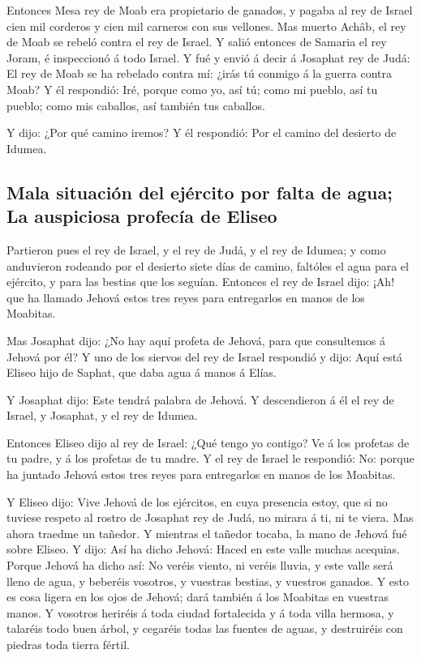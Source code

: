  Entonces Mesa rey de Moab era propietario de ganados, y
pagaba al rey de Israel cien mil corderos y cien mil carneros con sus
vellones.  Mas muerto Achâb, el rey de Moab se rebeló contra
el rey de Israel.  Y salió entonces de Samaria el rey Joram,
é inspeccionó á todo Israel.  Y fué y envió á decir á
Josaphat rey de Judá: El rey de Moab se ha rebelado contra mí: ¿irás tú
conmigo á la guerra contra Moab? Y él respondió: Iré, porque como yo,
así tú; como mi pueblo, así tu pueblo; como mis caballos, así también
tus caballos.

 Y dijo: ¿Por qué camino iremos? Y él respondió: Por el
camino del desierto de Idumea.

\hypertarget{mala-situaciuxf3n-del-ejuxe9rcito-por-falta-de-agua-la-auspiciosa-profecuxeda-de-eliseo}{%
\subsection{Mala situación del ejército por falta de agua; La auspiciosa
profecía de
Eliseo}\label{mala-situaciuxf3n-del-ejuxe9rcito-por-falta-de-agua-la-auspiciosa-profecuxeda-de-eliseo}}

 Partieron pues el rey de Israel, y el rey de Judá, y el rey
de Idumea; y como anduvieron rodeando por el desierto siete días de
camino, faltóles el agua para el ejército, y para las bestias que los
seguían.  Entonces el rey de Israel dijo: ¡Ah! que ha
llamado Jehová estos tres reyes para entregarlos en manos de los
Moabitas.

 Mas Josaphat dijo: ¿No hay aquí profeta de Jehová, para
que consultemos á Jehová por él? Y uno de los siervos del rey de Israel
respondió y dijo: Aquí está Eliseo hijo de Saphat, que daba agua á manos
á Elías.

 Y Josaphat dijo: Este tendrá palabra de Jehová. Y
descendieron á él el rey de Israel, y Josaphat, y el rey de Idumea.

 Entonces Eliseo dijo al rey de Israel: ¿Qué tengo yo
contigo? Ve á los profetas de tu padre, y á los profetas de tu madre. Y
el rey de Israel le respondió: No: porque ha juntado Jehová estos tres
reyes para entregarlos en manos de los Moabitas.

 Y Eliseo dijo: Vive Jehová de los ejércitos, en cuya
presencia estoy, que si no tuviese respeto al rostro de Josaphat rey de
Judá, no mirara á ti, ni te viera.  Mas ahora traedme un
tañedor. Y mientras el tañedor tocaba, la mano de Jehová fué sobre
Eliseo.  Y dijo: Así ha dicho Jehová: Haced en este valle
muchas acequias.  Porque Jehová ha dicho así: No veréis
viento, ni veréis lluvia, y este valle será lleno de agua, y beberéis
vosotros, y vuestras bestias, y vuestros ganados.  Y esto
es cosa ligera en los ojos de Jehová; dará también á los Moabitas en
vuestras manos.  Y vosotros heriréis á toda ciudad
fortalecida y á toda villa hermosa, y talaréis todo buen árbol, y
cegaréis todas las fuentes de aguas, y destruiréis con piedras toda
tierra fértil.

